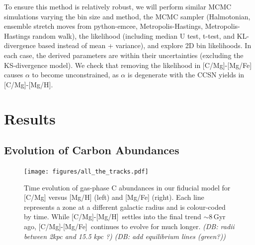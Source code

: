 \documentclass[fleqn,
usenatbib]{mnras}
\newcommand{\caah}{[C/Mg]-[Mg/H]}
\newcommand{\caafe}{[C/Mg]-[Mg/Fe]}
\newcommand{\dbnote}[1]{ {\color{Thistle} \textit{\small (DB: #1)}} }
\begin{document}
To ensure this method is relatively robust, we will perform similar MCMC simulations varying the bin size and method, the MCMC sampler (Halmotonian, ensemble stretch moves from python-emcee, Metropolis-Hastings, Metropolis-Hastings random walk), the likelihood (including median U test, t-test, and KL-divergence based instead of mean + variance), and explore 2D bin likelihoods. In each case, the derived parameters are within their uncertainties (excluding the KS-divergence model).  We check that removing the likelihood in \caafe{} causes $\alpha$ to become unconstrained, as $\alpha$ is degenerate with the CCSN yields in \caah.


\section{Results}\label{sec:results}

\subsection{Evolution of Carbon Abundances}

\begin{figure}
\centering
\texttt{[image: figures/all\_the\_tracks.pdf]}
\caption[]{
    Time evolution of gas-phase C abundances in our fiducial model for [C/Mg] versus [Mg/H] (left) and [Mg/Fe] (right).
    Each line represents a zone at a different galactic radius and is colour-coded by time. While \caah\ settles into the final trend $\sim{8}$\,Gyr ago, \caafe\ continues to evolve for much longer.
    \dbnote{radii between 2kpc and 15.5 kpc ?}
    \dbnote{add equilibrium lines (green?)}
}
\label{fig:c_evo}
\end{figure}

\end{document}
